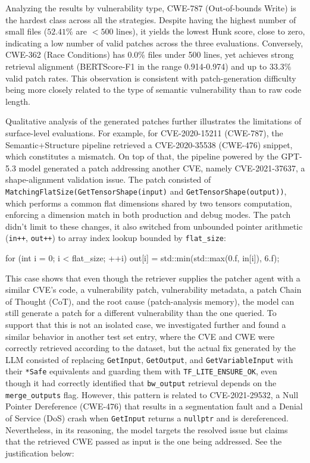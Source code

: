 Analyzing the results by vulnerability type, CWE-787 (Out-of-bounds Write) is the hardest class across all the strategies. Despite having the highest number of small files ($52.41\%$ are $<500$ lines), it yields the lowest Hunk score, close to zero, indicating a low number of valid patches across the three evaluations.
Conversely, CWE-362 (Race Conditions) has 0.0\% files under 500 lines, yet achieves strong retrieval alignment (BERTScore-F1 in the range 0.914-0.974) and up to 33.3\% valid patch rates.
This observation is consistent with patch-generation difficulty being more closely related to the type of semantic vulnerability than to raw code length.


Qualitative analysis of the generated patches further illustrates the limitations of surface-level evaluations. For example, for CVE-2020-15211 (CWE-787), the Semantic+Structure pipeline retrieved a CVE-2020-35538 (CWE-476) snippet, which constitutes a mismatch. On top of that, the pipeline powered by the GPT-5.3 model generated a patch addressing another CVE, namely CVE-2021-37637, a shape-alignment validation issue. 
The patch consisted of \texttt{MatchingFlatSize(GetTensorShape(input)} and \texttt{GetTensorShape(output))}, which performs a common flat dimensions shared by two tensors computation, enforcing a dimension match in both production and debug modes. 
The patch didn't limit to these changes, it also switched from unbounded pointer arithmetic (\texttt{in++}, \texttt{out++}) to array index lookup bounded by \texttt{flat\_size}:

\begin{lightcpp}
for (int i = 0; i < flat_size; ++i) {
    out[i] = std::min(std::max(0.f, in[i]), 6.f);
}
\end{lightcpp}

This case shows that even though the retriever supplies the patcher agent with a similar CVE's code, a vulnerability patch, vulnerability metadata, a patch Chain of Thought (CoT), and the root cause (patch-analysis memory), the model can still generate a patch for a different vulnerability than the one queried. 
To support that this is not an isolated case, we investigated further and found a similar behavior in another test set entry, 
where the CVE and CWE were correctly retrieved according to the dataset, but the actual fix generated by the LLM consisted of replacing \texttt{GetInput}, \texttt{GetOutput}, and \texttt{GetVariableInput} with their \texttt{*Safe} equivalents and guarding them with \texttt{TF\_LITE\_ENSURE\_OK}, even though it had correctly identified that \texttt{bw\_output} retrieval depends on the \texttt{merge\_outputs} flag. However, this pattern is related to CVE-2021-29532, a Null Pointer Dereference (CWE-476) that results in a segmentation fault and a Denial of Service (DoS) crash when \texttt{GetInput} returns a \texttt{nullptr} and is dereferenced. Nevertheless, in its reasoning, the model targets the resolved issue but claims that the retrieved CWE passed as input is the one being addressed. See the justification below: 

